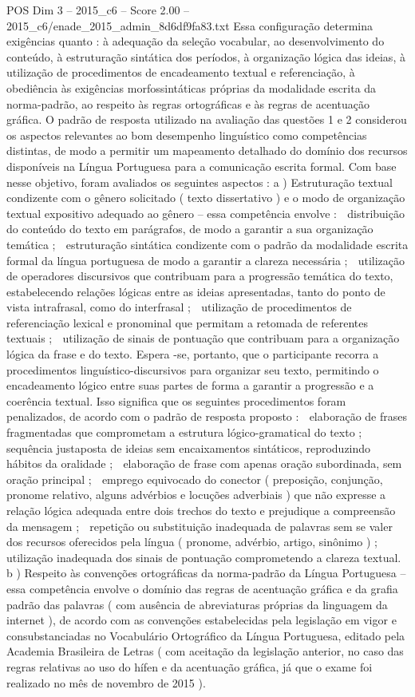 \begin{textsample}{POS Dim 3 – 2015\_c6 – Score 2.00 – 2015\_c6/enade\_2015\_admin\_8d6df9fa83.txt}
Essa configuração determina exigências quanto : à adequação da seleção vocabular, ao desenvolvimento do conteúdo, à estruturação sintática dos períodos, à organização lógica das ideias, à utilização de procedimentos de encadeamento textual e referenciação, à obediência às exigências morfossintáticas próprias da modalidade escrita da norma-padrão, ao respeito às regras ortográficas e às regras de acentuação gráfica.
O padrão de resposta utilizado na avaliação das questões 1 e 2 considerou os aspectos relevantes ao bom desempenho linguístico como competências distintas, de modo a permitir um mapeamento detalhado do domínio dos recursos disponíveis na Língua Portuguesa para a comunicação escrita formal.
Com base nesse objetivo, foram avaliados os seguintes aspectos : a ) Estruturação textual condizente com o gênero solicitado ( texto dissertativo ) e o modo de organização textual expositivo adequado ao gênero – essa competência envolve :  distribuição do conteúdo do texto em parágrafos, de modo a garantir a sua organização temática ;  estruturação sintática condizente com o padrão da modalidade escrita formal da língua portuguesa de modo a garantir a clareza necessária ;  utilização de operadores discursivos que contribuam para a progressão temática do texto, estabelecendo relações lógicas entre as ideias apresentadas, tanto do ponto de vista intrafrasal, como do interfrasal ;  utilização de procedimentos de referenciação lexical e pronominal que permitam a retomada de referentes textuais ;  utilização de sinais de pontuação que contribuam para a organização lógica da frase e do texto.
Espera -se, portanto, que o participante recorra a procedimentos linguístico-discursivos para organizar seu texto, permitindo o encadeamento lógico entre suas partes de forma a garantir a progressão e a coerência textual.
Isso significa que os seguintes procedimentos foram penalizados, de acordo com o padrão de resposta proposto :  elaboração de frases fragmentadas que comprometam a estrutura lógico-gramatical do texto ;  sequência justaposta de ideias sem encaixamentos sintáticos, reproduzindo hábitos da oralidade ;  elaboração de frase com apenas oração subordinada, sem oração principal ;  emprego equivocado do conector ( preposição, conjunção, pronome relativo, alguns advérbios e locuções adverbiais ) que não expresse a relação lógica adequada entre dois trechos do texto e prejudique a compreensão da mensagem ;  repetição ou substituição inadequada de palavras sem se valer dos recursos oferecidos pela língua ( pronome, advérbio, artigo, sinônimo ) ;  utilização inadequada dos sinais de pontuação comprometendo a clareza textual. b ) Respeito às convenções ortográficas da norma-padrão da Língua Portuguesa – essa competência envolve o domínio das regras de acentuação gráfica e da grafia padrão das palavras ( com ausência de abreviaturas próprias da linguagem da internet ), de acordo com as convenções estabelecidas pela legislação em vigor e consubstanciadas no Vocabulário Ortográfico da Língua Portuguesa, editado pela Academia Brasileira de Letras ( com aceitação da legislação anterior, no caso das regras relativas ao uso do hífen e da acentuação gráfica, já que o exame foi realizado no mês de novembro de 2015 ).

\end{textsample}
